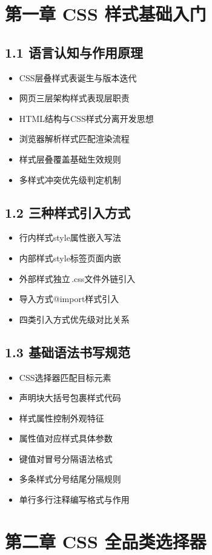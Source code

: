 
\section{第一章 CSS 样式基础入门}
\subsection{1.1 语言认知与作用原理}
\begin{itemize}[leftmargin=*]
\item CSS层叠样式表诞生与版本迭代
\item 网页三层架构样式表现层职责
\item HTML结构与CSS样式分离开发思想
\item 浏览器解析样式匹配渲染流程
\item 样式层叠覆盖基础生效规则
\item 多样式冲突优先级判定机制
\end{itemize}

\subsection{1.2 三种样式引入方式}
\begin{itemize}[leftmargin=*]
\item 行内样式style属性嵌入写法
\item 内部样式style标签页面内嵌
\item 外部样式独立\,.css文件外链引入
\item 导入方式@import样式引入
\item 四类引入方式优先级对比关系
\end{itemize}

\subsection{1.3 基础语法书写规范}
\begin{itemize}[leftmargin=*]
\item CSS选择器匹配目标元素
\item 声明块大括号包裹样式代码
\item 样式属性控制外观特征
\item 属性值对应样式具体参数
\item 键值对冒号分隔语法格式
\item 多条样式分号结尾分隔规则
\item 单行多行注释编写格式与作用
\end{itemize}

\section{第二章 CSS 全品类选择器}
